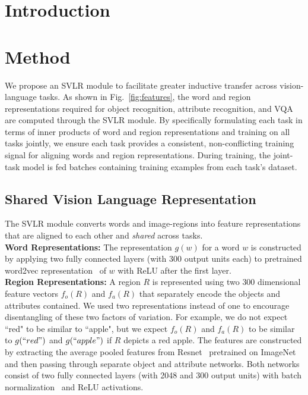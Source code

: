 \documentclass[10pt,twocolumn,letterpaper]{article}
\begin{document}
\vspace{-5mm}

\section{Introduction}













\section{Method}
We propose an SVLR module to facilitate greater inductive transfer across vision-language tasks. As shown in Fig.~\ref{fig:features}, the word and region representations required for object recognition, attribute recognition, and VQA are computed through the SVLR module. By specifically formulating each task in terms of inner products of word and region representations and training on all tasks jointly, we ensure each task provides a consistent, non-conflicting training signal for aligning words and region representations. During training, the joint-task model is fed batches containing training examples from each task's dataset.

\vspace{-1mm}

\subsection{Shared Vision Language Representation}
\label{sec:embedding}
The SVLR module converts words and image-regions into feature representations that are aligned to each other and \textit{shared} across tasks.  \\

\noindent\textbf{Word Representations:} The representation $g(w)$ for a word $w$ is constructed by applying two fully connected layers (with 300 output units each) to pretrained word2vec representation~\cite{word2vec} of $w$ with ReLU after the first layer. \\

\noindent\textbf{Region Representations:} A region $R$ is represented using two $300$ dimensional feature vectors $f_o(R)$ and $f_a(R)$ that separately encode the objects and attributes contained. We used two representations instead of one to encourage disentangling of these two factors of variation. For example, we do not expect ``red" to be similar to ``apple", but we expect $f_o(R)$ and $f_a(R)$ to be similar to $g(``red")$ and $g(``apple")$ if $R$ depicts a red apple. The features are constructed by extracting the average pooled features from Resnet~\cite{he2015deep} pretrained on ImageNet and then passing through separate object and attribute networks. Both networks consist of two fully connected layers (with 2048 and 300 output units) with batch normalization~\cite{batchnorm} and ReLU activations. 
\end{document}
